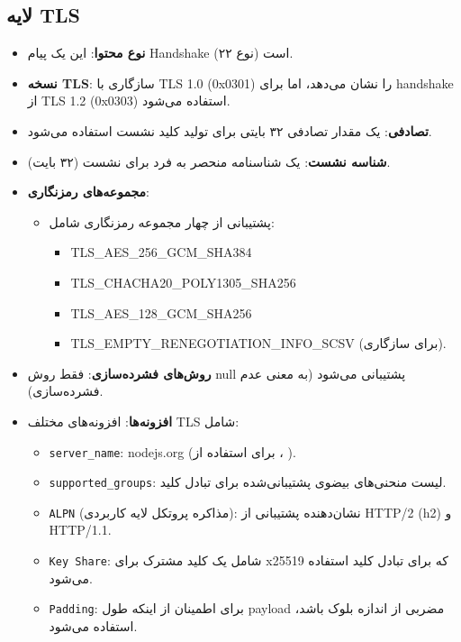 \subsection*{لایه TLS}
\begin{itemize}[label={--}]
    \item \textbf{نوع محتوا}: این یک پیام Handshake (نوع ۲۲) است.
    \item \textbf{نسخه TLS}: سازگاری با TLS 1.0 (0x0301) را نشان می‌دهد، اما برای handshake از TLS 1.2 (0x0303) استفاده می‌شود.
    \item \textbf{تصادفی}: یک مقدار تصادفی ۳۲ بایتی برای تولید کلید نشست استفاده می‌شود.
    \item \textbf{شناسه نشست}: یک شناسنامه منحصر به فرد برای نشست (۳۲ بایت).
    \item \textbf{مجموعه‌های رمزنگاری}:
    \begin{itemize}
        \item پشتیبانی از چهار مجموعه رمزنگاری شامل:
        \begin{itemize}
            \item TLS\_AES\_256\_GCM\_SHA384
            \item TLS\_CHACHA20\_POLY1305\_SHA256
            \item TLS\_AES\_128\_GCM\_SHA256
            \item TLS\_EMPTY\_RENEGOTIATION\_INFO\_SCSV (برای سازگاری).
        \end{itemize}
    \end{itemize}
    \item \textbf{روش‌های فشرده‌سازی}: فقط روش null پشتیبانی می‌شود (به معنی عدم فشرده‌سازی).
    \item \textbf{افزونه‌ها}: افزونه‌های مختلف TLS شامل:
    \begin{itemize}
        \item \texttt{server\_name}: nodejs.org (برای استفاده از ، ).
        \item \texttt{supported\_groups}: لیست منحنی‌های بیضوی پشتیبانی‌شده برای تبادل کلید.
        \item \texttt{ALPN} (مذاکره پروتکل لایه کاربردی): نشان‌دهنده پشتیبانی از HTTP/2 (h2) و HTTP/1.1.
        \item \texttt{Key Share}: شامل یک کلید مشترک برای x25519 که برای تبادل کلید استفاده می‌شود.
        \item \texttt{Padding}: برای اطمینان از اینکه طول payload مضربی از اندازه بلوک باشد، استفاده می‌شود.
    \end{itemize}
\end{itemize}

